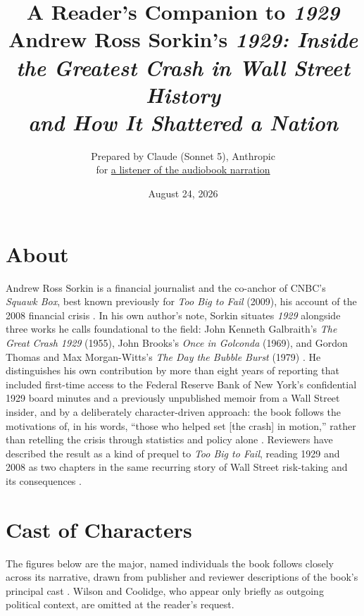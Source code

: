\documentclass[11pt]{article}
\title{\textbf{A Reader's Companion to \emph{1929}}\\[0.3em]
\large Andrew Ross Sorkin's \emph{1929: Inside the Greatest Crash in Wall Street History \\ and How It Shattered a Nation}}
\author{Prepared by Claude (Sonnet 5), Anthropic \\ \small for \href{mailto:icos.atropa@gmail.com}{a listener of the audiobook narration}}
\date{August 24, 2026}
\begin{document}
\maketitle

\tableofcontents

\section{About}
\label{sec:about}

Andrew Ross Sorkin is a financial journalist and the co-anchor of CNBC's
\emph{Squawk Box}, best known previously for \emph{Too Big to Fail} (2009), his
account of the 2008 financial crisis \autocite{sorkin2025book,prh1929,goodreads1929,
airmail1929}. In his own author's note, Sorkin situates \emph{1929} alongside three
works he calls foundational to the field: John Kenneth Galbraith's \emph{The Great
Crash 1929} (1955), John Brooks's \emph{Once in Golconda} (1969), and Gordon Thomas
and Max Morgan-Witts's \emph{The Day the Bubble Burst} (1979)
\autocite{sorkinPreviewPDF}. He distinguishes his own contribution by more than
eight years of reporting that included first-time access to the Federal Reserve
Bank of New York's confidential 1929 board minutes and a previously unpublished
memoir from a Wall Street insider, and by a deliberately character-driven
approach: the book follows the motivations of, in his words, ``those who helped
set [the crash] in motion,'' rather than retelling the crisis through statistics
and policy alone \autocite{sorkinPreviewPDF,axios1929,realclearmarkets1929}.
Reviewers have described the result as a kind of prequel to \emph{Too Big to
Fail}, reading 1929 and 2008 as two chapters in the same recurring story of
Wall Street risk-taking and its consequences \autocite{airmail1929}.

\section{Cast of Characters}
\label{sec:cast-characters}

The figures below are the major, named individuals the book follows closely across
its narrative, drawn from publisher and reviewer descriptions of the book's
principal cast \autocite{supersummary1929,supersummaryKeyFigures,booksthatslay1929,
littlerbooks1929}. Wilson and Coolidge, who appear only briefly as outgoing political
context, are omitted at the reader's request.
\end{document}
